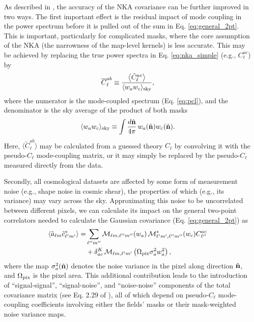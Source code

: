 \documentclass[%
 reprint,
superscriptaddress,
nofootinbib,
 amsmath,amssymb,
 aps,
 prd,
]{revtex4-2}
\newcommand{\nv}{\hat{\bf n}}
\begin{document}
    As described in \cite{2010.09717}, the accuracy of the NKA covariance can be further improved in two ways. The first important effect is the residual impact of mode coupling in the power spectrum before it is pulled out of the sum in Eq. \ref{eq:general_2pt}. This is important, particularly for complicated masks, where the core assumption of the NKA (the narrowness of the map-level kernels) is less accurate. This may be achieved by replacing the true power spectra in Eq. \ref{eq:nka_simple} (e.g., $C_\ell^{ac}$) by
    \begin{equation}\label{eq:clbar0}
      \overline{C}^{ab}_\ell\equiv\frac{\left\langle \tilde{C}^{ac}_\ell\right\rangle}{\langle w_aw_c\rangle_{\rm sky}},
    \end{equation}
    where the numerator is the mode-coupled spectrum (Eq. \ref{eq:pcl}), and the denominator is the sky average of the product of both masks
    \begin{equation}
      \langle w_aw_c\rangle_{\rm sky}\equiv\int\frac{d\nv}{4\pi}\,w_a(\nv)w_c(\nv).
    \end{equation}
    Here, $\langle\tilde{C}^{ab}_\ell\rangle$ may be calculated from a guessed theory $C_\ell$ by convolving it with the pseudo-$C_\ell$ mode-coupling matrix, or it may simply be replaced by the pseudo-$C_\ell$ measured directly from the data.

    Secondly, all cosmological datasets are affected by some form of measurement noise (e.g., shape noise in cosmic shear), the properties of which (e.g., its variance) may vary across the sky. Approximating this noise to be uncorrelated between different pixels, we can calculate its impact on the general two-point correlators needed to calculate the Gaussian covariance (Eq. \ref{eq:general_2pt}) as
    \begin{align}\label{eq:general_2pt_wnoise}
      \langle\tilde{a}_{\ell m}\tilde{c}_{\ell'm'}^*\rangle
      =&\sum_{\ell''m''}{\cal M}_{\ell m,\ell''m''}(w_a)\,{\cal M}^{*}_{\ell' m',\ell''m''}(w_c)C_{\ell''}^{ac}\\\nonumber
      &+\delta_{ac}^K\,{\cal M}_{\ell m,\ell'm'}\left(\Omega_{\rm pix}\sigma_a^2w_a^2\right),
    \end{align}
    where the map $\sigma_a^2(\nv)$ denotes the noise variance in the pixel along direction $\nv$, and $\Omega_{\rm pix}$ is the pixel area. This additional contribution leads to the introduction of ``signal-signal'', ``signal-noise'', and ``noise-noise'' components of the total covariance matrix (see Eq. 2.29 of \cite{2010.09717}), all of which depend on pseudo-$C_\ell$ mode-coupling coefficients involving either the fields' masks or their mask-weighted noise variance maps.
\end{document}
